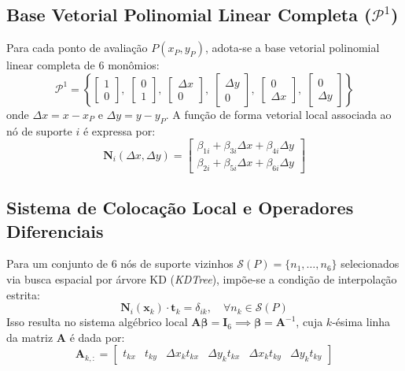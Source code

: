 \documentclass[11pt,a4paper]{article}
\begin{document}
\subsection{Base Vetorial Polinomial Linear Completa (\texorpdfstring{$\mathcal{P}^1$}{P1})}
Para cada ponto de avalia\c{c}\~ao $P(x_P, y_P)$, adota-se a base vetorial polinomial linear completa de 6 mon\^omios:
\begin{equation}
\mathcal{P}^1 = \left\{
\begin{bmatrix} 1 \\ 0 \end{bmatrix}, \;
\begin{bmatrix} 0 \\ 1 \end{bmatrix}, \;
\begin{bmatrix} \Delta x \\ 0 \end{bmatrix}, \;
\begin{bmatrix} \Delta y \\ 0 \end{bmatrix}, \;
\begin{bmatrix} 0 \\ \Delta x \end{bmatrix}, \;
\begin{bmatrix} 0 \\ \Delta y \end{bmatrix}
\right\}
\end{equation}
onde $\Delta x = x - x_P$ e $\Delta y = y - y_P$. A fun\c{c}\~ao de forma vetorial local associada ao n\'o de suporte $i$ \'e expressa por:
\begin{equation}
\mathbf{N}_i(\Delta x, \Delta y) = \begin{bmatrix} \beta_{1i} + \beta_{3i}\Delta x + \beta_{4i}\Delta y \\ \beta_{2i} + \beta_{5i}\Delta x + \beta_{6i}\Delta y \end{bmatrix}
\end{equation}

\subsection{Sistema de Coloca\c{c}\~ao Local e Operadores Diferenciais}
Para um conjunto de 6 n\'os de suporte vizinhos $\mathcal{S}(P) = \{n_1, \dots, n_6\}$ selecionados via busca espacial por \'arvore KD (\textit{KDTree}), imp\~oe-se a condi\c{c}\~ao de interpola\c{c}\~ao estrita:
\begin{equation}
\mathbf{N}_i(\mathbf{x}_k) \cdot \mathbf{t}_k = \delta_{ik}, \quad \forall n_k \in \mathcal{S}(P)
\end{equation}
Isso resulta no sistema alg\'ebrico local $\mathbf{A}\boldsymbol{\beta} = \mathbf{I}_6 \implies \boldsymbol{\beta} = \mathbf{A}^{-1}$, cuja $k$-\'esima linha da matriz $\mathbf{A}$ \'e dada por:
\begin{equation}
\mathbf{A}_{k,:} = \begin{bmatrix} t_{kx} & t_{ky} & \Delta x_k t_{kx} & \Delta y_k t_{kx} & \Delta x_k t_{ky} & \Delta y_k t_{ky} \end{bmatrix}
\end{equation}
\end{document}
